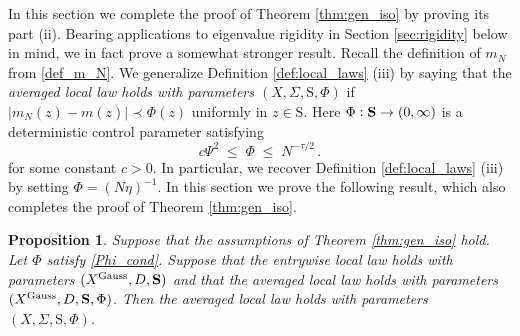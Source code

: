\documentclass[11pt]{article} %
\numberwithin{equation}{section}
\numberwithin{figure}{section}
\theoremstyle{plain} %
\newtheorem{proposition}[theorem]{Proposition}
\theoremstyle{definition} %
\newcommand{\f}[1]{\boldsymbol{\mathrm{#1}}} %
\newcommand{\txt}[1]{\text{\rm{#1}}}
\newcommand{\col}{\mathrel{\vcenter{\baselineskip0.75ex \lineskiplimit0pt \hbox{.}\hbox{.}}}}
\renewcommand{\leq}{\leqslant}
\newcommand{\abs}[1]{\lvert #1 \rvert}
\begin{document}
In this section we complete the proof of Theorem \ref{thm:gen_iso} by proving its part (ii). Bearing applications to eigenvalue rigidity in Section \ref{sec:rigidity} below in mind, we in fact prove a somewhat stronger result. Recall the definition of $m_N$ from \eqref{def_m_N}. We generalize Definition \ref{def:local_laws} (iii) by saying that the \emph{averaged local law holds with parameters $(X, \Sigma, \f S, \Phi)$} if
$
\abs{m_N(z) - m(z)} \prec \Phi(z)$
uniformly in $z \in \f S$. Here $\Phi \col \f S \to (0,\infty)$ is a deterministic control parameter satisfying
\begin{equation} \label{Phi_cond}
c \Psi^2 \;\leq\; \Phi \;\leq\; N^{-\tau/2}\,.
\end{equation}
for some constant $c > 0$.
In particular, we recover Definition \ref{def:local_laws} (iii) by setting $\Phi = (N \eta)^{-1}$.
In this section we prove the following result, which also completes the proof of Theorem \ref{thm:gen_iso}.

\begin{proposition} \label{prop:gen_avg}
Suppose that the assumptions of Theorem \ref{thm:gen_iso} hold. Let $\Phi$ satisfy \eqref{Phi_cond}. Suppose that the entrywise local law holds with parameters $(X^{\txt{Gauss}}, D, \f S)$ and that the averaged local law holds with parameters $(X^{\txt{Gauss}}, D, \f S, \Phi)$. Then the averaged local law holds with parameters $(X, \Sigma, \f S, \Phi)$.
\end{proposition}
\end{document}
